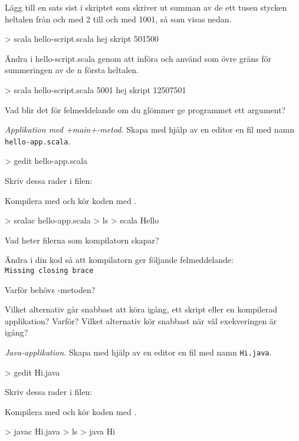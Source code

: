 \Subtask Lägg till en sats sist i skriptet som skriver ut summan av de ett tusen stycken heltalen från och med 2 till och med 1001, så som visas nedan.
\begin{REPL}
> scala hello-script.scala
hej skript
501500
\end{REPL}

\Subtask Ändra i hello-script.scala genom att införa  och använd  som övre gräns för summeringen av de n första heltalen.
\begin{REPL}
> scala hello-script.scala 5001
hej skript
12507501
\end{REPL}

\Subtask Vad blir det för felmeddelande om du glömmer ge programmet ett argument?


\Task \emph{Applikation med \code+main+-metod.} Skapa med hjälp av en editor en fil med namn \texttt{hello-app.scala}.
\begin{REPL}
> gedit hello-app.scala
\end{REPL}
Skriv dessa rader i filen:



\Subtask Kompilera med  och kör koden med .
\begin{REPL}
> scalac hello-app.scala
> ls
> scala Hello
\end{REPL}
Vad heter filerna som kompilatorn skapar?

\Subtask Ändra i din kod så att kompilatorn ger följande felmeddelande: \\
\texttt{Missing closing brace}

\Subtask\Pen Varför behövs -metoden?

\Subtask\Pen Vilket alternativ går snabbast att köra igång, ett skript eller en kompilerad applikation? Varför? Vilket alternativ kör snabbast när väl exekveringen är igång?


\Task \label{task:java} \emph{Java-applikation.} Skapa med hjälp av en editor en fil med namn \texttt{Hi.java}.
\begin{REPL}
> gedit Hi.java
\end{REPL}
Skriv dessa rader i filen:


\noindent Kompilera med  och kör koden med .
\begin{REPL}
> javac Hi.java
> ls
> java Hi
\end{REPL}

